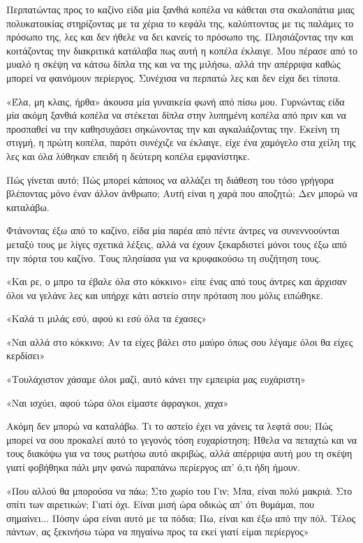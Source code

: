 \documentclass[12pt,twoside, openany]{book}
\begin{document}
Περπατώντας προς το καζίνο είδα μία ξανθιά κοπέλα να κάθεται στα σκαλοπάτια μιας πολυκατοικίας στηρίζοντας με τα χέρια το κεφάλι της, καλύπτοντας με τις παλάμες το πρόσωπο της, λες και δεν ήθελε να δει κανείς το πρόσωπο της. Πλησιάζοντας την και κοιτάζοντας την διακριτικά κατάλαβα πως αυτή η κοπέλα έκλαιγε. Μου πέρασε από το μυαλό η σκέψη να κάτσω δίπλα της και να της μιλήσω, αλλά την απέρριψα καθώς μπορεί να φαινόμουν περίεργος. Συνέχισα να περπατώ λες και δεν είχα δει τίποτα.

«Έλα, μη κλαις, ήρθα» άκουσα μία γυναικεία φωνή από πίσω μου. Γυρνώντας είδα μία ακόμη ξανθιά κοπέλα να στέκεται δίπλα στην λυπημένη κοπέλα από πριν και να προσπαθεί να την καθησυχάσει σηκώνοντας την και αγκαλιάζοντας την. Εκείνη τη στιγμή, η πρώτη κοπέλα, παρότι συνέχιζε να έκλαιγε, είχε ένα χαμόγελο στα χείλη της λες και όλα λύθηκαν επειδή η δεύτερη κοπέλα εμφανίστηκε.

Πώς γίνεται αυτό; Πώς μπορεί κάποιος να αλλάζει τη διάθεση του τόσο γρήγορα βλέποντας μόνο έναν άλλον άνθρωπο; Αυτή είναι η χαρά που αποζητώ; Δεν μπορώ να καταλάβω.

Φτάνοντας έξω από το καζίνο, είδα μία παρέα από πέντε άντρες να συνεννοούνται μεταξύ τους με λίγες σχετικά λέξεις, αλλά να έχουν ξεκαρδιστεί μόνοι τους έξω από την πόρτα του καζίνο. Τους πλησίασα για να κρυφακούσω τη συζήτηση τους.

«Και ρε, ο μπρο τα έβαλε όλα στο κόκκινο» είπε ένας από τους άντρες και άρχισαν όλοι να γελάνε λες και υπήρχε κάτι αστείο στην πρόταση που μόλις ειπώθηκε.

«Καλά τι μιλάς εσύ, αφού κι εσύ όλα τα έχασες»

«Ναι αλλά στο κόκκινο; Αν τα είχες βάλει στο μαύρο όπως σου λέγαμε όλοι θα είχες κερδίσει»

«Τουλάχιστον χάσαμε όλοι μαζί, αυτό κάνει την εμπειρία μας ευχάριστη»

«Ναι ισχύει, αφού τώρα όλοι είμαστε άφραγκοι, χαχα»

Ακόμη δεν μπορώ να καταλάβω. Τι το αστείο έχει να χάνεις τα λεφτά σου; Πώς μπορεί να σου προκαλεί αυτό το γεγονός τόση ευχαρίστηση; Ήθελα να πεταχτώ και να τους διακόψω για να τους ρωτήσω αυτό ακριβώς, αλλά απέρριψα αυτή μου τη σκέψη γιατί φοβήθηκα πάλι μην φανώ παραπάνω περίεργος απ’ ό,τι ήδη ήμουν.

«Που αλλού θα μπορούσα να πάω; Στο χωρίο του Γιν; Μπα, είναι πολύ μακριά. Στο σπίτι των αιρετικών; Γιατί όχι. Είναι μισή ώρα οδικώς απ’ ότι θυμάμαι, που σημαίνει... Πόσην ώρα είναι αυτό με τα πόδια; Πω, είναι και έξω από την πόλ. Τέλος πάντων, ας ξεκινήσω τώρα να πηγαίνω προς τα εκεί γιατί είμαι περίεργος»
\end{document}
